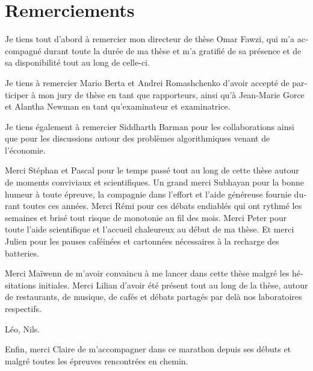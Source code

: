 \thispagestyle{empty}
\chapter*{Remerciements}

\begin{otherlanguage}{french}
  Je tiens tout d'abord à remercier mon directeur de thèse Omar Fawzi, qui m'a accompagné durant toute la durée de ma thèse et m'a gratifié de sa présence et de sa disponibilité tout au long de celle-ci.

  Je tiens à remercier Mario Berta et Andrei Romashchenko d'avoir accepté de participer à mon jury de thèse en tant que rapporteurs, ainsi qu'à Jean-Marie Gorce et Alantha Newman en tant qu'examinateur et examinatrice.

  Je tiens également à remercier Siddharth Barman pour les collaborations ainsi que pour les discussions autour des problèmes algorithmiques venant de l'économie.

  Merci Stéphan et Pascal pour le temps passé tout au long de cette thèse autour de moments conviviaux et scientifiques. Un grand merci Subhayan pour la bonne humeur à toute épreuve, la compagnie dans l'effort et l'aide généreuse fournie durant toutes ces années. Merci Rémi pour ces débats endiablés qui ont rythmé les semaines et brisé tout risque de monotonie au fil des mois. Merci Peter pour toute l'aide scientifique et l'accueil chaleureux au début de ma thèse. Et merci Julien pour les pauses caféinées et cartonnées nécessaires à la recharge des batteries.

  Merci Maïwenn de m'avoir convaincu à me lancer dans cette thèse malgré les hésitations initiales. Merci Lilian d'avoir été présent tout au long de la thèse, autour de restaurants, de musique, de cafés et débats partagés par delà nos laboratoires respectifs.

  Léo, Nils.

  Enfin, merci Claire de m'accompagner dans ce marathon depuis ses débuts et malgré toutes les épreuves rencontrées en chemin.
\end{otherlanguage}
 
